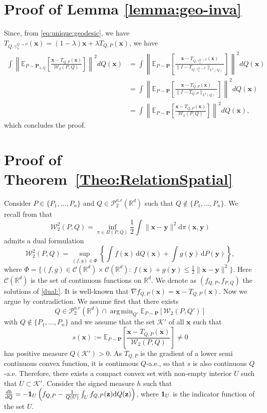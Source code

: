 \documentclass{imsart}
\numberwithin{equation}{section}
\def\R{\mathbb{R}}
\def\E{\mathbb{E}}
\def\z{\mathbf{z}}
\def\x{\mathbf{x}}
\def\y{\mathbf{y}}
\DeclareMathOperator*{\argmin}{arg\,min}
\def\E{\mathbb E}
\def\x{\mathbf x}
\def\z{\mathbf z}
\def\y{\mathbf y}
\begin{document}
\section{Proof of Lemma \ref{lemma:geo-inva}}
Since, from \eqref{eq:unique:geodesic},
we have
$T_{Q,\gamma^{Q\to P}_\lambda}(\x)= (1-\lambda)\x+\lambda T_{Q,P}(\x) $, we have
\begin{align*}
	\int{ \left\|\E_{P\sim \mathbf{P}_{\lambda,Q} }\left[  \frac{\x-T_{Q,P}(\x) }{\mathcal{W}_2(P,Q)}\right]\right\|^2} dQ(\x) &=\int{ \left\|\E_{P\sim \mathbf{P}}\left[  \frac{\x-T_{Q,\gamma^{Q\to P}_\lambda}(\x) }{\|I-T_{Q,\gamma^{Q\to P}_\lambda}\|_{L^2(Q)}}\right]\right\|^2} dQ(\x)  \\
	&=\int{ \left\|\E_{P\sim \mathbf{P}}\left[  \frac{ \x- T_{Q,P}(\x) }{\|I-T_{Q,P}\|_{L^2(Q)}}\right]\right\|^2} dQ(\x) \\
	&= \int{ \left\|\E_{P\sim \mathbf{P} }\left[  \frac{\x-T_{Q,P}(\x) }{\mathcal{W}_2(P,Q)}\right]\right\|^2} dQ(\x) ,
\end{align*}
which concludes the proof. 



\section{Proof of Theorem~\ref{Theo:RelationSpatial}}
Consider $P \in \{ P_1 , \ldots , P_n \}$ and $Q \in \mathcal{P}_{2}^{a.c}(\R^d)$ such that $Q \not \in \{ P_1 , \ldots , P_n \}$.
We recall from \cite{villani2003topics} that 
\begin{equation}\label{WassertesinAppen}
	\mathcal{W}_2^2(P,Q)=\inf_{\pi\in \Pi(P,Q) } \frac{1}{2} \int \|\x-\y\|^2 \mathrm{d}\pi(\x,\y)
\end{equation}
admits a dual formulation 
\begin{equation}
	\label{dual:}
	\mathcal{W}_2^2(P,Q) =\sup_{(f,g)\in \Phi} \left\{ \int f(\x) \, \mathrm{d}Q(\x) + \int g(\y) \, \mathrm{d}P(\y) \right\},
\end{equation}
where $ \Phi=\{ (f,g)\in \mathcal{C}(\R^d)\times \mathcal{C}(\R^d): 
\  f(\x)+g(\y)\leq\frac{1}{2}\|\x-\y\|^2 \}$.
Here $\mathcal{C}(\R^d)$ is the set of continuous functions on $\R^d$. 
We denote as $(f_{Q,P},f_{P,Q})$ the solutions of \eqref{dual:}. It is well-known that $\nabla f_{Q,P}(\x)=\x-T_{Q,P}(\x)$.  
Now we argue by contradiction. 
We assume first that there exists 
$$ Q\in  \mathcal{P}_2^{a.c} (\R^d) \cap \argmin_{Q'}  \E_{P\sim \mathbf{P}}[\mathcal{W}_2(P,Q')] 
$$
with $Q \not \in \{ P_1 , \ldots , P_n \}$
and we assume that the set $\mathcal{K}'$ of all $\x$ such that 
$$
s(\x):=\E_{P\sim \mathbf{P}}\left[  \frac{\x-T_{Q,P}(\x) }{\mathcal{W}_2(P,Q)}\right]\neq 0 
$$
has positive measure $Q(\mathcal{K}')>0$. 
As $T_{Q,P}$ is the gradient of a lower semi continuous convex function, it is continuous $Q$-a.e., so that $s$ is also continuous $Q$-a.e. Therefore, there exists a compact convex set with non-empty interior $U$ such that   $U\subset \mathcal{K}'$.   
Consider the signed measure $h$ such that 
$\frac{d h}{dQ}=-{\bf 1}_U \left(f_{Q,P} -
\frac{1}{Q(U)}
\int_U f_{Q,P}(\z) \mathrm{d}Q(\z) \right) $, where ${\bf 1}_{U} $ is the indicator function of the set $U$.
\end{document}
